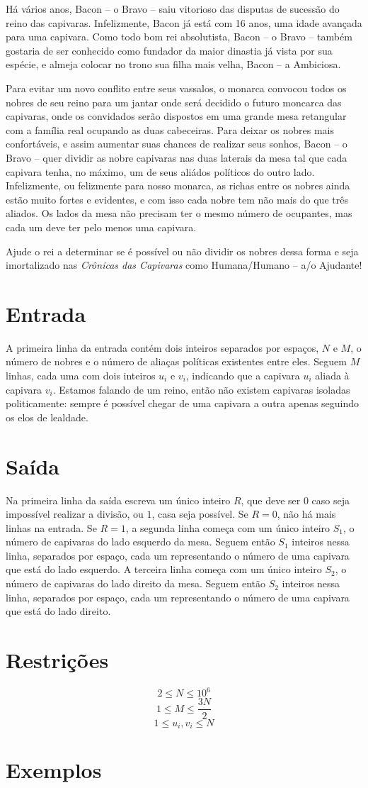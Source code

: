 Há vários anos, Bacon -- o Bravo -- saiu vitorioso das disputas de sucessão do reino das capivaras.
Infelizmente, Bacon já está com 16 anos, uma idade avançada para uma capivara.
Como todo bom rei absolutista, Bacon -- o Bravo -- também gostaria de ser conhecido como fundador
da maior dinastia já vista por sua espécie, e almeja colocar no trono sua filha mais velha,
Bacon -- a Ambiciosa.

Para evitar um novo conflito entre seus vassalos, o monarca convocou todos os nobres de seu reino
para um jantar onde será decidido o futuro moncarca das capivaras, onde os convidados serão dispostos em uma
grande mesa retangular com a família real ocupando as duas cabeceiras.
Para deixar os nobres mais confortáveis, e assim aumentar suas chances de realizar seus sonhos,
Bacon -- o Bravo -- quer dividir as nobre capivaras nas duas laterais da mesa tal que cada capivara tenha,
no máximo, um de seus aliádos políticos do outro lado.
Infelizmente, ou felizmente para nosso monarca, as richas entre os nobres ainda estão muito fortes e evidentes,
e com isso cada nobre tem não mais do que três aliados.
Os lados da mesa não precisam ter o mesmo número de ocupantes, mas cada um deve ter pelo menos uma capivara.

Ajude o rei a determinar se é possível ou não dividir os nobres dessa forma e seja imortalizado nas 
\textit{Crônicas das Capivaras} como Humana/Humano -- a/o Ajudante!

\section*{Entrada}

A primeira linha da entrada contém dois inteiros separados por espaços, $N$ e $M$, o número de nobres e o número
de aliaças políticas existentes entre eles.
Seguem $M$ linhas, cada uma com dois inteiros $u_i$ e $v_i$, indicando que a capivara $u_i$ aliada à capivara $v_i$.
Estamos falando de um reino, então não existem capivaras isoladas politicamente: sempre é possível chegar de uma capivara
a outra apenas seguindo os elos de lealdade.

\section*{Saída}

Na primeira linha da saída escreva um único inteiro $R$, que deve ser $0$ caso seja impossível realizar a divisão,
ou $1$, casa seja possível.
Se $R = 0$, não há mais linhas na entrada.
Se $R = 1$, a segunda linha começa com um único inteiro $S_1$, o número de capivaras do lado esquerdo da mesa.
Seguem então $S_1$ inteiros nessa linha, separados por espaço, cada um representando o número de uma capivara que está do lado esquerdo.
A terceira linha começa com um único inteiro $S_2$, o número de capivaras do lado direito da mesa.
Seguem então $S_2$ inteiros nessa linha, separados por espaço, cada um representando o número de uma capivara que está do lado direito.


\section*{Restrições}

$$2 \leq N \leq 10^{6}$$
$$1 \leq M \leq \frac{3N}{2}$$
$$1 \leq u_i, v_i \leq N$$

\section*{Exemplos}
\exemplo
